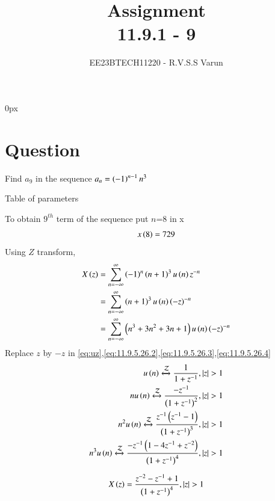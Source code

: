 \documentclass[journal,12pt,twocolumn]{IEEEtran}
\theoremstyle{remark}
\begin{document}
\parindent 0px


\title{Assignment\\[1ex]11.9.1 - 9}
\author{EE23BTECH11220 - R.V.S.S Varun$^{}$%
}
\maketitle
\newpage
\bigskip

\renewcommand{\thefigure}{\theenumi}
\renewcommand{\thetable}{\theenumi}
\section*{Question}
Find $a_{9}$ in the sequence $a_{n}=\left(-1\right)^{n-1}n^{3}$ 
\fi
 
\begin{table}[h]
    \centering
   
    
    \caption{Table of parameters}
    \label{tab:11.9.1.9.1}
\end{table}


To obtain $9^{th}$ term of the sequence put $n$=8 in x
\begin{align}
x\left(8\right)=729
\end{align}
Using $Z$ transform,
\begin{align}
	X\left(z\right)&=\sum_{n=-\infty}^{\infty}\left(-1\right)^n\left(n+1\right)^3u\left(n\right)z^{-n}\\
	&=\sum_{n=-\infty}^{\infty}\left(n+1\right)^3u\left(n\right)\left(-z\right)^{-n}\\
	&=\sum_{n=-\infty}^{\infty}\left(n^3+3n^2+3n+1\right)u\left(n\right)\left(-z\right)^{-n}
\end{align}
Replace $z$ by $-z$ in \eqref{eq:uz},\eqref{eq:11.9.5.26.2},\eqref{eq:11.9.5.26.3},\eqref{eq:11.9.5.26.4}
\begin{align}
	u\left(n\right)\xleftrightarrow{\mathcal{Z}}\frac{1}{1+z^{-1}},\left\vert z\right\vert>1\\
	nu\left(n\right)\xleftrightarrow{\mathcal{Z}}\frac{-z^{-1}}{\left(1+z^{-1}\right)^2},\left\vert z\right\vert>1\\
	n^2u\left(n\right)\xleftrightarrow{\mathcal{Z}}\frac{z^{-1}\left(z^{-1}-1\right)}{\left(1+z^{-1}\right)^3},\left\vert z\right\vert>1\\
	n^3u\left(n\right)\xleftrightarrow{\mathcal{Z}}\frac{-z^{-1}\left(1-4z^{-1}+z^{-2}\right)}{\left(1+z^{-1}\right)^4},\left\vert z\right\vert>1
\end{align}

\begin{align}
	X\left(z\right)=\frac{z^{-2}-z^{-1}+1}{\left(1+z^{-1}\right)^4},\left\vert z\right\vert>1
\end{align}
\end{document}

